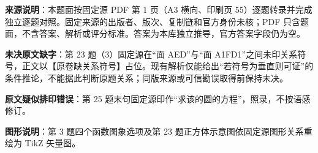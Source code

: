 


\begin{gktip}
\textbf{来源说明}：本题面按固定源 PDF 第 1 页（A3 横向、印刷页 55）逐题转录并完成独立逐题对照。固定来源的出版者、版次、复制链和官方身份未核；PDF 只含题面，不含答案、解析或评分标准。答案为本库独立推导，官方答案字段仍为空。

\textbf{未决原文缺字}：第 23 题（3）固定源在“面 AED”与“面 A1FD1”之间未印关系符号，正文以【原卷缺关系符号】占位。现有解析仅能给出“若符号为垂直则可证”的条件推论，不能据此判断原题关系；同版来源或可信勘误取得前保持未决。

\textbf{原文疑似排印错误}：第 25 题末句固定源印作“求该的圆的方程”，照录，不按语感修订。

\textbf{图形说明}：第 3 题四个函数图象选项及第 23 题正方体示意图依固定源图形关系重绘为 TikZ 矢量图。
\end{gktip}


